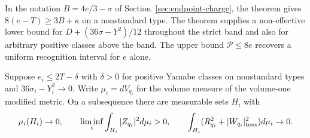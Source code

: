 In the notation \(B=4e/3-\sigma\) of Section~\ref{sec:endpoint-charge},
the theorem gives \(8(e-T)\ge3B+\kappa\) on a nonstandard type.
The theorem supplies a non-effective lower bound for
\(D+(36\sigma-Y^2)/12\) throughout the strict band and also for
arbitrary positive classes above the band. The upper bound
\(\mathcal P\le8e\) recovers a uniform recognition interval for
\(e\) alone.

\begin{corollary}
\label{cor:isotropic-ricci-tail}
Suppose \(e_i\le2T-\delta\) with \(\delta>0\) for positive Yamabe
classes on nonstandard types and \(36\sigma_i-Y_i^2\to0\).
Write \(\mu_i=dV_{q_i}\) for the volume measure of the volume-one
modified metric. On a subsequence there are measurable sets \(H_i\) with
\[
 \mu_i(H_i)\to0,\qquad
 \liminf_i\int_{H_i}|Z_{q_i}|^2d\mu_i>0,\qquad
 \int_{H_i}(R_{q_i}^2+|W_{q_i}|_{\rm tens}^2)d\mu_i\to0 .
\]
\end{corollary}
